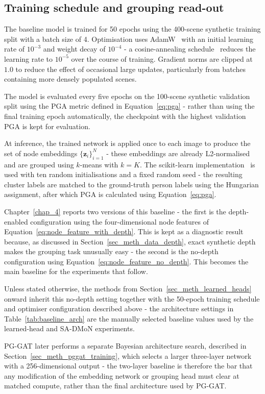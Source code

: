 \subsection{Training schedule and grouping read-out}
\label{sec_meth_baseline_training}

The baseline model is trained for 50 epochs
using the 400-scene synthetic training split with a batch size of 4.
Optimisation uses AdamW~\cite{loshchilov2019adamw}
with an initial learning rate of $10^{-3}$ and weight decay of $10^{-4}$ -
a cosine-annealing schedule~\cite{loshchilov2017cosineannealing}
reduces the learning rate to $10^{-5}$ over the course of training.
Gradient norms are clipped at $1.0$ to reduce the effect of occasional large updates,
particularly from batches containing more densely populated scenes.

The model is evaluated every five epochs
on the 100-scene synthetic validation split
using the PGA metric defined in Equation~\eqref{eq:pga} -
rather than using the final training epoch automatically,
the checkpoint with the highest validation PGA is kept for evaluation.

At inference,
the trained network is applied once to each image
to produce the set of node embeddings $\{\mathbf{z}_i\}_{i=1}^{N}$ -
these embeddings are already L2-normalised and are grouped using $k$-means with $k=K$.
The scikit-learn implementation~\cite{scikitlearn} is used
with ten random initialisations and a fixed random seed -
the resulting cluster labels are matched to the ground-truth person labels
using the Hungarian assignment,
after which PGA is calculated using Equation~\eqref{eq:pga}.

Chapter~\ref{chap_4} reports two versions of this baseline -
the first is the depth-enabled configuration
using the four-dimensional node features of Equation~\eqref{eq:node_feature_with_depth}.
This is kept as a diagnostic result because,
as discussed in Section~\ref{sec_meth_data_depth},
exact synthetic depth makes the grouping task unusually easy -
the second is the no-depth configuration using Equation~\eqref{eq:node_feature_no_depth}.
This becomes the main baseline for the experiments that follow.

Unless stated otherwise,
the methods from Section~\ref{sec_meth_learned_heads} onward inherit this no-depth setting
together with the 50-epoch training schedule and optimiser configuration described above -
the architecture settings in Table~\ref{tab:baseline_arch}
are the manually selected baseline values used by the learned-head and SA-DMoN experiments.

PG-GAT later performs a separate Bayesian architecture search,
described in Section~\ref{sec_meth_pggat_training},
which selects a larger three-layer network with a 256-dimensional output -
the two-layer baseline is therefore the bar
that any modification of the embedding network or grouping head must clear at matched compute,
rather than the final architecture used by PG-GAT.